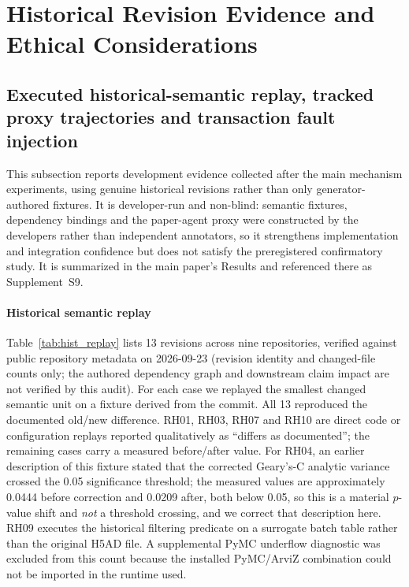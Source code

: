 \documentclass[journal]{IEEEtran}
\begin{document}
\section{Historical Revision Evidence and Ethical Considerations}
\subsection{Executed historical-semantic replay, tracked proxy trajectories and transaction fault injection}
\label{sec:hist_replay_supp}
This subsection reports development evidence collected after the main mechanism experiments, using genuine historical revisions rather than only generator-authored fixtures. It is developer-run and non-blind: semantic fixtures, dependency bindings and the paper-agent proxy were constructed by the developers rather than independent annotators, so it strengthens implementation and integration confidence but does not satisfy the preregistered confirmatory study. It is summarized in the main paper's Results and referenced there as Supplement~S9.

\paragraph{Historical semantic replay} Table~\ref{tab:hist_replay} lists 13 revisions across nine repositories, verified against public repository metadata on 2026-09-23 (revision identity and changed-file counts only; the authored dependency graph and downstream claim impact are not verified by this audit). For each case we replayed the smallest changed semantic unit on a fixture derived from the commit. All 13 reproduced the documented old/new difference. RH01, RH03, RH07 and RH10 are direct code or configuration replays reported qualitatively as ``differs as documented''; the remaining cases carry a measured before/after value. For RH04, an earlier description of this fixture stated that the corrected Geary's-C analytic variance crossed the 0.05 significance threshold; the measured values are approximately 0.0444 before correction and 0.0209 after, both below 0.05, so this is a material $p$-value shift and \emph{not} a threshold crossing, and we correct that description here. RH09 executes the historical filtering predicate on a surrogate batch table rather than the original H5AD file. A supplemental PyMC underflow diagnostic was excluded from this count because the installed PyMC/ArviZ combination could not be imported in the runtime used.
\end{document}
